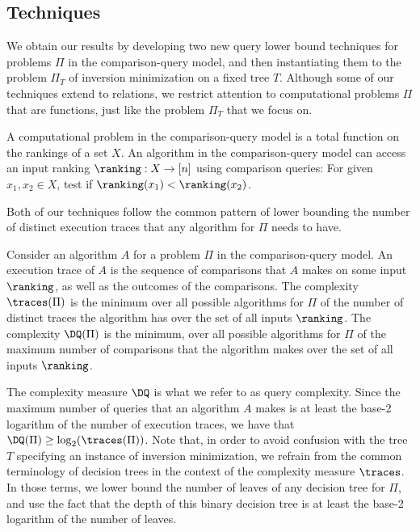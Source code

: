 \subsection{Techniques} 
%
We obtain our results by developing two new query lower bound techniques for
%
problems $\Pi$ in the comparison-query model, and then instantiating them to the problem $\Pi_T$ of inversion minimization on a fixed tree $T$. Although some of our techniques extend to relations, we restrict attention to computational problems $\Pi$ that are functions, %
%
just like the problem $\Pi_T$ that we focus on.
\begin{definition}
\label{def:computational-problem}
A computational problem in the comparison-query model is a total function on the rankings of a set $X$. An algorithm in the comparison-query model can access an input ranking $\ranking: X \to [n]$ using comparison queries: For given $x_1,x_2 \in X$, test if $\ranking(x_1)< \ranking(x_2)$.
\end{definition}

Both of our techniques follow the common pattern of lower bounding the number of distinct execution traces that any algorithm for $\Pi$ needs to have.
\begin{definition}
\label{def:execution-and-deterministic}
Consider an algorithm $A$ for a problem $\Pi$ in the comparison-query model. An execution trace of $A$ is the sequence of comparisons that $A$ makes on some input $\ranking$, as well as the outcomes of the comparisons. The complexity $\traces(\Pi)$ is the minimum over all possible algorithms for $\Pi$ of the number of distinct traces the algorithm has over the set of all inputs $\ranking$. The complexity $\DQ(\Pi)$ is the minimum, over all possible algorithms for $\Pi$ of the maximum number of comparisons that the algorithm makes over the set of all inputs $\ranking$.
\end{definition}
The complexity measure $\DQ$ is what we refer to as query complexity. Since the maximum number of queries that an algorithm $A$ makes is at least the base-2 logarithm of the number of execution traces, we have that $\DQ(\Pi) \ge \log_2(\traces(\Pi))$. 
Note that, in order to avoid confusion with the tree $T$ specifying an instance of inversion minimization, we refrain from the common terminology of decision trees in the context of the complexity measure $\traces$. In those terms, we lower bound the number of leaves of any decision tree for $\Pi$, and use the fact that the depth of this binary decision tree is at least the base-2 logarithm of the number of leaves.

